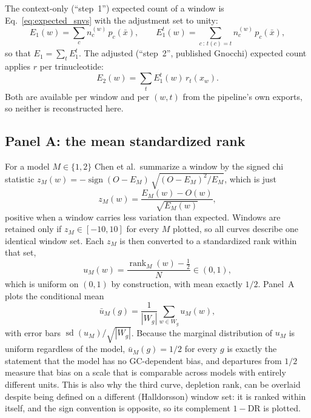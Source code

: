 \documentclass{article}
\begin{document}
The context-only (``step~1'') expected count of a window is
Eq.~\eqref{eq:expected_snvs} with the adjustment set to unity:
\begin{equation}
    E_1(w) = \sum_c n_c^{(w)}\, p_c(\bar{x}),
    \qquad
    E_1^{t}(w) = \sum_{c\,:\,t(c)=t} n_c^{(w)}\, p_c(\bar{x}),
    \label{eq:E1}
\end{equation}
so that $E_1 = \sum_t E_1^t$. The adjusted (``step~2'', published Gnocchi)
expected count applies $r$ per trinucleotide:
\begin{equation}
    E_2(w) = \sum_t E_1^{t}(w)\, r_t(x_w).
    \label{eq:E2}
\end{equation}
Both are available per window and per $(w,t)$ from the pipeline's own exports, so
neither is reconstructed here.

\subsection{Panel A: the mean standardized rank}

For a model $M \in \{1, 2\}$ Chen et al.\ summarize a window by the signed
chi statistic
$z_M(w) = -\operatorname{sign}(O - E_M)\,\sqrt{(O-E_M)^2/E_M}$,
which is just
\begin{equation}
    z_M(w) = \frac{E_M(w) - O(w)}{\sqrt{E_M(w)}},
    \label{eq:z}
\end{equation}
positive when a window carries less variation than expected. Windows are retained
only if $z_M \in [-10,10]$ for every $M$ plotted, so all curves describe one
identical window set. Each $z_M$ is then converted to a standardized rank within
that set,
\begin{equation}
    u_M(w) = \frac{\operatorname{rank}_M(w) - \tfrac{1}{2}}{N} \in (0,1),
\end{equation}
which is uniform on $(0,1)$ by construction, with mean exactly $1/2$. Panel~A
plots the conditional mean
\begin{equation}
    \bar{u}_M(g) = \frac{1}{|W_g|}\sum_{w\in W_g} u_M(w),
    \label{eq:panelA}
\end{equation}
with error bars $\operatorname{sd}(u_M)/\sqrt{|W_g|}$. Because the marginal
distribution of $u_M$ is uniform regardless of the model, $\bar{u}_M(g) = 1/2$ for
every $g$ is exactly the statement that the model has no GC-dependent bias, and
departures from $1/2$ measure that bias on a scale that is comparable across
models with entirely different units. This is also why the third curve, depletion
rank, can be overlaid despite being defined on a different (Halldorsson) window
set: it is ranked within itself, and the sign convention is opposite, so its
complement $1 - \mathrm{DR}$ is plotted.
\end{document}

